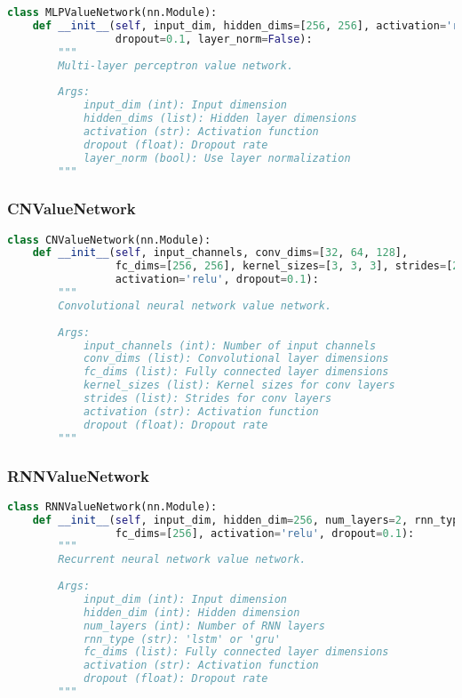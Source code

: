\begin{lstlisting}[language=python]
class MLPValueNetwork(nn.Module):
    def __init__(self, input_dim, hidden_dims=[256, 256], activation='relu',
                 dropout=0.1, layer_norm=False):
        """
        Multi-layer perceptron value network.
        
        Args:
            input_dim (int): Input dimension
            hidden_dims (list): Hidden layer dimensions
            activation (str): Activation function
            dropout (float): Dropout rate
            layer_norm (bool): Use layer normalization
        """
\end{lstlisting}

\subsubsection{CNValueNetwork}

\begin{lstlisting}[language=python]
class CNValueNetwork(nn.Module):
    def __init__(self, input_channels, conv_dims=[32, 64, 128],
                 fc_dims=[256, 256], kernel_sizes=[3, 3, 3], strides=[2, 2, 2],
                 activation='relu', dropout=0.1):
        """
        Convolutional neural network value network.
        
        Args:
            input_channels (int): Number of input channels
            conv_dims (list): Convolutional layer dimensions
            fc_dims (list): Fully connected layer dimensions
            kernel_sizes (list): Kernel sizes for conv layers
            strides (list): Strides for conv layers
            activation (str): Activation function
            dropout (float): Dropout rate
        """
\end{lstlisting}

\subsubsection{RNNValueNetwork}

\begin{lstlisting}[language=python]
class RNNValueNetwork(nn.Module):
    def __init__(self, input_dim, hidden_dim=256, num_layers=2, rnn_type='lstm',
                 fc_dims=[256], activation='relu', dropout=0.1):
        """
        Recurrent neural network value network.
        
        Args:
            input_dim (int): Input dimension
            hidden_dim (int): Hidden dimension
            num_layers (int): Number of RNN layers
            rnn_type (str): 'lstm' or 'gru'
            fc_dims (list): Fully connected layer dimensions
            activation (str): Activation function
            dropout (float): Dropout rate
        """
\end{lstlisting}


